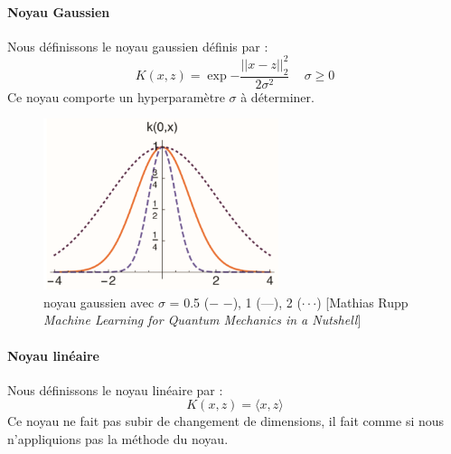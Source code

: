 \documentclass[a4paper,12pt,titlepage]{report}
\begin{document}
\paragraph{Noyau Gaussien} 
Nous définissons le noyau gaussien définis par :
\[ 
	K(x,z) = \exp{- \frac{||x-z||_{2}^2}{2\sigma^2}} \, \quad \sigma \geqslant 0 
\]
Ce noyau comporte un hyperparamètre $\sigma$ à déterminer.
\begin{figure}[!h]
	\begin{center}
		\includegraphics[height = 5cm, keepaspectratio]{graphes/noyaux_gaussien.png}
		\caption{noyau gaussien avec $\sigma$ = 0.5 ($-$ $-$), 1 (---), 2 ($\cdot\cdot\cdot$) [Mathias Rupp \textit{Machine Learning for Quantum Mechanics in a Nutshell}]}
	\end{center}
\end{figure}

\paragraph{Noyau linéaire} Nous définissons le noyau linéaire par :
\[ 
	K(x,z) = \langle x,z\rangle
\]
Ce noyau ne fait pas subir de changement de dimensions, il fait comme si nous n'appliquions pas la méthode du noyau.
\end{document}
